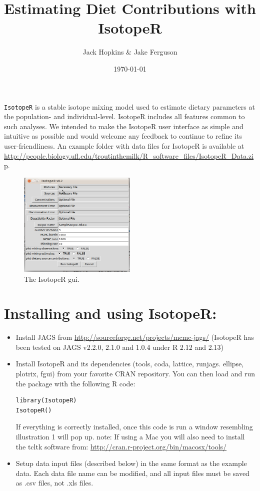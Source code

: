 \documentclass{article}
\author{Jack Hopkins \& Jake Ferguson}
\title{Estimating Diet Contributions with IsotopeR}
\date{\today}
\newcommand{\code}[1]{{\tt #1}}
\begin{document}
\maketitle
\tableofcontents



\code{IsotopeR} is a stable isotope mixing model used to estimate dietary parameters at the population- and individual-level. IsotopeR includes all features common to such analyses. We intended to make the IsotopeR user interface as simple and intuitive as possible and would welcome any feedback to continue to refine its user-friendliness. An example folder with data files for IsotopeR is available at \url{http://people.biology.ufl.edu/troutinthemilk/R_software_files/IsotopeR_Data.zip}.

\begin{figure}[h]
\begin{center}
  \includegraphics[width=0.5\textwidth]{IsoScreen.png}
\end{center}
\caption{The IsotopeR gui.}
\end{figure}


\section*{Installing and using IsotopeR:}

\begin{itemize}
\item Install JAGS from \url{http://sourceforge.net/projects/mcmc-jags/} (IsotopeR has been tested on JAGS v2.2.0, 2.1.0 and 1.0.4 under R 2.12 and 2.13)
\item  Install IsotopeR and its dependencies (tools, coda, lattice, runjags. ellipse, plotrix, fgui) from your favorite CRAN repository. You can then load and run the package with the following R code:
\begin{verbatim}
library(IsotopeR)
IsotopeR()
\end{verbatim}
If everything is correctly installed, once this code is run a window resembling illustration 1 will pop up.
	note: If using a Mac you will also need to install  the tcltk software from: \url{http://cran.r-project.org/bin/macosx/tools/}
\item  Setup data input files (described below) in the same format as the example data. Each data file name can be modified,  and all input files must be saved as .csv files, not .xls files.
\end{itemize}
\end{document}
